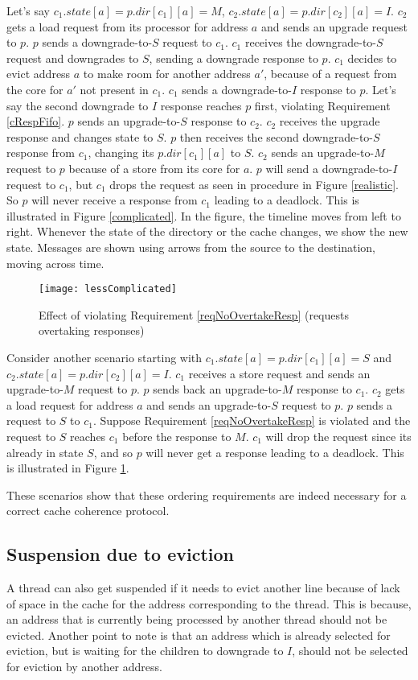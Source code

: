 Let's say $c_1.state[a] = p.dir[c_1][a] = M$, $c_2.state[a] = p.dir[c_2][a] =
I$. $c_2$ gets a load request from its processor for address $a$ and sends an
upgrade request to $p$. $p$ sends a downgrade-to-$S$ request to $c_1$. $c_1$
receives the downgrade-to-$S$ request and downgrades to $S$, sending a downgrade
response to $p$. $c_1$ decides to evict address $a$ to make room for another
address $a'$, because of a request from the core for $a'$ not present in $c_1$.
$c_1$ sends a downgrade-to-$I$ response to $p$. Let's say the second downgrade
to $I$ response reaches $p$ first, violating Requirement \ref{cRespFifo}. $p$
sends an upgrade-to-$S$ response to $c_2$. $c_2$ receives the upgrade response
and changes state to $S$. $p$ then receives the second downgrade-to-$S$ response
from $c_1$, changing its $p.dir[c_1][a]$ to $S$. $c_2$ sends an upgrade-to-$M$
request to $p$ because of a store from its core for $a$. $p$ will send a
downgrade-to-$I$ request to $c_1$, but $c_1$ drops the request as seen in
procedure \dReq{} in Figure \ref{realistic}. So $p$ will never receive a
response from $c_1$ leading to a deadlock. This is illustrated in Figure
\ref{complicated}. In the figure, the timeline moves from left to right.
Whenever the state of the directory or the cache changes, we show the new state.
Messages are shown using arrows from the source to the destination, moving
across time.

\begin{figure}
\centering
\texttt{[image: lessComplicated]}
\caption{Effect of violating Requirement \ref{reqNoOvertakeResp} (requests overtaking responses)}
\label{lessComplicated}
\end{figure}

Consider another scenario starting with $c_1.state[a] = p.dir[c_1][a] = S$ and
$c_2.state[a] = p.dir[c_2][a] = I$. $c_1$ receives a store request and sends an
upgrade-to-$M$ request to $p$. $p$ sends back an upgrade-to-$M$ response to
$c_1$. $c_2$ gets a load request for address $a$ and sends an upgrade-to-$S$
request to $p$. $p$ sends a request to $S$ to $c_1$. Suppose Requirement
\ref{reqNoOvertakeResp} is violated and the request to $S$ reaches $c_1$ before
the response to $M$. $c_1$ will drop the request since its already in state $S$,
and so $p$ will never get a response leading to a deadlock. This is illustrated
in Figure \ref{lessComplicated}.

These scenarios show that these ordering requirements are indeed necessary for a
correct cache coherence protocol.


\subsection{Suspension due to eviction}
A thread can also get suspended if it needs to evict another line because of
lack of space in the cache for the address corresponding to the thread. This is
because, an address that is currently being processed by another thread should
not be evicted. Another point to note is that an address which is already
selected for eviction, but is waiting for the children to downgrade to $I$,
should not be selected for eviction by another address.
